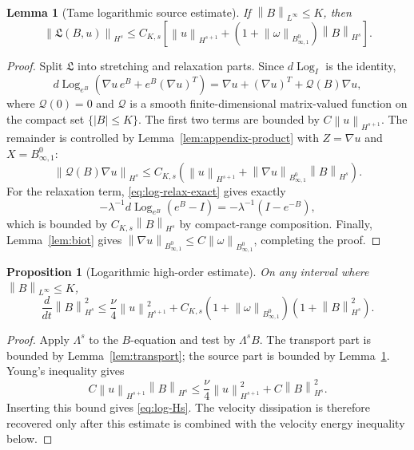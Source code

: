 \documentclass[11pt]{article}
\numberwithin{equation}{section}
\newtheorem{proposition}[theorem]{Proposition}
\newtheorem{lemma}[theorem]{Lemma}
\newcommand{\Id}{I}
\newcommand{\Log}{\operatorname{Log}}
\newcommand{\Besov}{B^0_{\infty,1}}
\newcommand{\norm}[1]{\left\lVert #1\right\rVert}
\begin{document}
\begin{lemma}[Tame logarithmic source estimate]
\label{lem:log-source}
If \(\norm{B}_{L^\infty}\le K\), then
\begin{equation}
  \norm{\mathfrak L(B,u)}_{H^s}
  \le
  C_{K,s}
  \left[
  \norm{u}_{H^{s+1}}
  +(1+\norm{\omega}_{\Besov})\norm{B}_{H^s}
  \right].
  \label{eq:log-source}
\end{equation}
\end{lemma}

\begin{proof}
Split \(\mathfrak L\) into stretching and relaxation parts.  Since
\(d\Log_{\Id}\) is the identity,
\[
  d\Log_{e^B}\left(\nabla u\,e^B+e^B(\nabla u)^T\right)
  =
  \nabla u+(\nabla u)^T+\mathcal Q(B)\nabla u ,
\]
where \(\mathcal Q(0)=0\) and \(\mathcal Q\) is a smooth finite-dimensional
matrix-valued function on the compact set \(\{|B|\le K\}\).  The first two
terms are bounded by \(C\norm{u}_{H^{s+1}}\).  The remainder is controlled by
Lemma~\ref{lem:appendix-product} with \(Z=\nabla u\) and
\(X=B^0_{\infty,1}\):
\[
  \norm{\mathcal Q(B)\nabla u}_{H^s}
  \le
  C_{K,s}\left(
  \norm{u}_{H^{s+1}}
  +\norm{\nabla u}_{B^0_{\infty,1}}\norm{B}_{H^s}
  \right).
\]
For the relaxation term, \eqref{eq:log-relax-exact} gives exactly
\[
  -\lambda^{-1}d\Log_{e^B}(e^B-\Id)
  =
  -\lambda^{-1}(\Id-e^{-B}),
\]
which is bounded by \(C_{K,s}\norm{B}_{H^s}\) by compact-range composition.
Finally, Lemma~\ref{lem:biot} gives
\(\norm{\nabla u}_{B^0_{\infty,1}}\le C\norm{\omega}_{\Besov}\), completing
the proof.
\end{proof}

\begin{proposition}[Logarithmic high-order estimate]
\label{prop:log-Hs}
On any interval where \(\norm{B}_{L^\infty}\le K\),
\begin{equation}
  \frac{d}{dt}\norm{B}_{H^s}^2
  \le
  \frac{\nu}{4}\norm{u}_{H^{s+1}}^2
  +
  C_{K,s}(1+\norm{\omega}_{\Besov})(1+\norm{B}_{H^s}^2).
  \label{eq:log-Hs}
\end{equation}
\end{proposition}

\begin{proof}
Apply \(\Lambda^s\) to the \(B\)-equation and test by \(\Lambda^sB\).  The
transport part is bounded by Lemma~\ref{lem:transport}; the source part is
bounded by Lemma~\ref{lem:log-source}.  Young's inequality gives
\[
  C\norm{u}_{H^{s+1}}\norm{B}_{H^s}
  \le
  \frac{\nu}{4}\norm{u}_{H^{s+1}}^2+C\norm{B}_{H^s}^2 .
\]
Inserting this bound gives \eqref{eq:log-Hs}.  The velocity dissipation is
therefore recovered only after this estimate is combined with the velocity
energy inequality below.
\end{proof}
\end{document}
